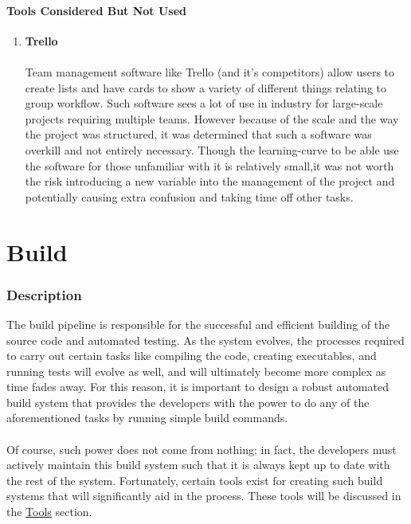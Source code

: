 \documentclass[12pt]{report}
\begin{document}
\subsection{Tools Considered But Not Used}
\begin{enumerate}
	\item \textbf{Trello}\\\\
		Team management software like Trello (and it's competitors) allow users to create lists and have cards to show a variety of different things relating to group workflow. Such software sees a lot of use in industry for large-scale projects requiring multiple teams. However because of the scale and the way the project was structured, it was determined that such a software was overkill and not entirely necessary. Though the learning-curve to be able use the software for those unfamiliar with it is relatively small,it was not worth the risk introducing a new variable into the management of the project and potentially causing extra confusion and taking time off other tasks.
\end{enumerate}

\part{Build}
\section{Description}
The build pipeline is responsible for the successful and efficient building of the source code and
automated testing. As the system evolves, the processes required to carry out certain tasks like
compiling the code, creating executables, and running tests will evolve as well, and will ultimately
become more complex as time fades away. For this reason, it is important to design a robust automated
build system that provides the developers with the power to do any of the aforementioned tasks by
running simple build commands.\\\\
Of course, such power does not come from nothing; in fact, the developers must actively maintain
this build system such that it is always kept up to date with the rest of the system. Fortunately,
certain tools exist for creating such build systems that will significantly aid in the process.
These tools will be discussed in the \hyperref[s:build-tools]{Tools} section.
\end{document}

